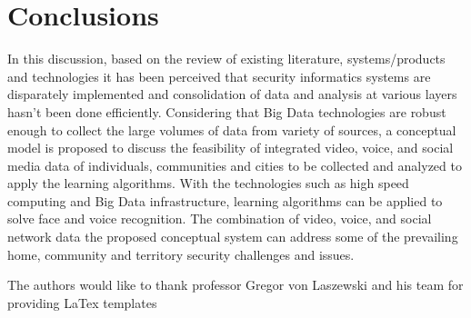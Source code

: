 \documentclass[sigconf]{acmart}
\begin{document}
\section{Conclusions}
In this discussion, based on the review of existing literature, systems/products and technologies it has been perceived that security informatics systems are disparately implemented and consolidation of data and analysis at various layers hasn’t been done efficiently. Considering that Big Data technologies are robust enough to collect the large volumes of data from variety of sources, a conceptual model is proposed to discuss the feasibility of integrated video, voice, and social media data of individuals, communities and cities to be collected and analyzed to apply the learning algorithms. With the technologies such as high speed computing and Big Data infrastructure, learning algorithms can be applied to solve face and voice recognition. The combination of video, voice, and social network data the proposed conceptual system can address some of the prevailing home, community and territory security challenges and issues.

\begin{acks}
The authors would like to thank professor Gregor von Laszewski and his team for providing LaTex templates
\end{acks}


 
\end{document}
